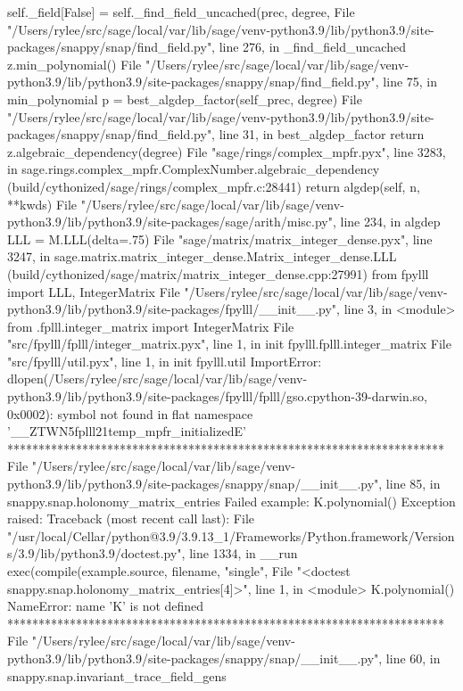         self._field[False] = self._find_field_uncached(prec, degree,
      File "/Users/rylee/src/sage/local/var/lib/sage/venv-python3.9/lib/python3.9/site-packages/snappy/snap/find_field.py", line 276, in _find_field_uncached
        z.min_polynomial()
      File "/Users/rylee/src/sage/local/var/lib/sage/venv-python3.9/lib/python3.9/site-packages/snappy/snap/find_field.py", line 75, in min_polynomial
        p = best_algdep_factor(self_prec, degree)
      File "/Users/rylee/src/sage/local/var/lib/sage/venv-python3.9/lib/python3.9/site-packages/snappy/snap/find_field.py", line 31, in best_algdep_factor
        return z.algebraic_dependency(degree)
      File "sage/rings/complex_mpfr.pyx", line 3283, in sage.rings.complex_mpfr.ComplexNumber.algebraic_dependency (build/cythonized/sage/rings/complex_mpfr.c:28441)
        return algdep(self, n, **kwds)
      File "/Users/rylee/src/sage/local/var/lib/sage/venv-python3.9/lib/python3.9/site-packages/sage/arith/misc.py", line 234, in algdep
        LLL = M.LLL(delta=.75)
      File "sage/matrix/matrix_integer_dense.pyx", line 3247, in sage.matrix.matrix_integer_dense.Matrix_integer_dense.LLL (build/cythonized/sage/matrix/matrix_integer_dense.cpp:27991)
        from fpylll import LLL, IntegerMatrix
      File "/Users/rylee/src/sage/local/var/lib/sage/venv-python3.9/lib/python3.9/site-packages/fpylll/__init__.py", line 3, in <module>
        from .fplll.integer_matrix import IntegerMatrix
      File "src/fpylll/fplll/integer_matrix.pyx", line 1, in init fpylll.fplll.integer_matrix
      File "src/fpylll/util.pyx", line 1, in init fpylll.util
    ImportError: dlopen(/Users/rylee/src/sage/local/var/lib/sage/venv-python3.9/lib/python3.9/site-packages/fpylll/fplll/gso.cpython-39-darwin.so, 0x0002): symbol not found in flat namespace '__ZTWN5fplll21temp_mpfr_initializedE'
**********************************************************************
File "/Users/rylee/src/sage/local/var/lib/sage/venv-python3.9/lib/python3.9/site-packages/snappy/snap/__init__.py", line 85, in snappy.snap.holonomy_matrix_entries
Failed example:
    K.polynomial()
Exception raised:
    Traceback (most recent call last):
      File "/usr/local/Cellar/python@3.9/3.9.13_1/Frameworks/Python.framework/Versions/3.9/lib/python3.9/doctest.py", line 1334, in __run
        exec(compile(example.source, filename, "single",
      File "<doctest snappy.snap.holonomy_matrix_entries[4]>", line 1, in <module>
        K.polynomial()
    NameError: name 'K' is not defined
**********************************************************************
File "/Users/rylee/src/sage/local/var/lib/sage/venv-python3.9/lib/python3.9/site-packages/snappy/snap/__init__.py", line 60, in snappy.snap.invariant_trace_field_gens
